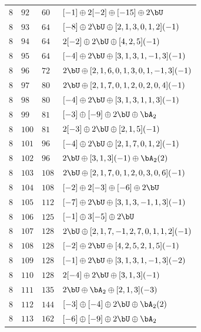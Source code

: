 \begin{center}
\begin{longtable}{llll}
 \(8\) & \(92\) & \(60\) & \([-1] \oplus 2 [-2] \oplus [-15] \oplus 2 \bU\) \\
 \(8\) & \(93\) & \(64\) & \([-8] \oplus 2 \bU \oplus [2, 1, 3, 0, 1, 2](-1)\) \\
 \(8\) & \(94\) & \(64\) & \(2 [-2] \oplus 2 \bU \oplus [4, 2, 5](-1)\) \\
 \(8\) & \(95\) & \(64\) & \([-4] \oplus 2 \bU \oplus [3, 1, 3, 1, -1, 3](-1)\) \\
 \(8\) & \(96\) & \(72\) & \(2 \bU \oplus [2, 1, 6, 0, 1, 3, 0, 1, -1, 3](-1)\) \\
 \(8\) & \(97\) & \(80\) & \(2 \bU \oplus [2, 1, 7, 0, 1, 2, 0, 2, 0, 4](-1)\) \\
 \(8\) & \(98\) & \(80\) & \([-4] \oplus 2 \bU \oplus [3, 1, 3, 1, 1, 3](-1)\) \\
 \(8\) & \(99\) & \(81\) & \([-3] \oplus [-9] \oplus 2 \bU \oplus \bA_{2}\) \\
 \(8\) & \(100\) & \(81\) & \(2 [-3] \oplus 2 \bU \oplus [2, 1, 5](-1)\) \\
 \(8\) & \(101\) & \(96\) & \([-4] \oplus 2 \bU \oplus [2, 1, 7, 0, 1, 2](-1)\) \\
 \(8\) & \(102\) & \(96\) & \(2 \bU \oplus [3, 1, 3](-1) \oplus \bA_{2}(2)\) \\
 \(8\) & \(103\) & \(108\) & \(2 \bU \oplus [2, 1, 7, 0, 1, 2, 0, 3, 0, 6](-1)\) \\
 \(8\) & \(104\) & \(108\) & \([-2] \oplus 2 [-3] \oplus [-6] \oplus 2 \bU\) \\
 \(8\) & \(105\) & \(112\) & \([-7] \oplus 2 \bU \oplus [3, 1, 3, -1, 1, 3](-1)\) \\
 \(8\) & \(106\) & \(125\) & \([-1] \oplus 3 [-5] \oplus 2 \bU\) \\
 \(8\) & \(107\) & \(128\) & \(2 \bU \oplus [2, 1, 7, -1, 2, 7, 0, 1, 1, 2](-1)\) \\
 \(8\) & \(108\) & \(128\) & \([-2] \oplus 2 \bU \oplus [4, 2, 5, 2, 1, 5](-1)\) \\
 \(8\) & \(109\) & \(128\) & \([-1] \oplus 2 \bU \oplus [3, 1, 3, 1, -1, 3](-2)\) \\
 \(8\) & \(110\) & \(128\) & \(2 [-4] \oplus 2 \bU \oplus [3, 1, 3](-1)\) \\
 \(8\) & \(111\) & \(135\) & \(2 \bU \oplus \bA_{2} \oplus [2, 1, 3](-3)\) \\
 \(8\) & \(112\) & \(144\) & \([-3] \oplus [-4] \oplus 2 \bU \oplus \bA_{2}(2)\) \\
 \(8\) & \(113\) & \(162\) & \([-6] \oplus [-9] \oplus 2 \bU \oplus \bA_{2}\) \\

\end{longtable}
\end{center}
